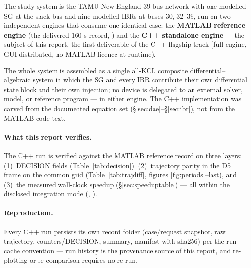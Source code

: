 The study system is the TAMU New England 39-bus network with one modelled SG at
the slack bus and nine modelled IBRs at buses 30, 32--39, run on two
independent engines that consume one identical case: the \textbf{MATLAB
reference engine} (the delivered 160-s record, )
and the \textbf{C++ standalone engine} --- the subject of this report, the
first deliverable of the C++ flagship track (full engine, GUI-distributed,
no MATLAB licence at runtime).

The whole system is assembled as a single all-KCL composite
differential--algebraic system in which the SG and every IBR contribute their
own differential state block and their own injection; no device is delegated
to an external solver, model, or reference program --- in either engine.  The
C++ implementation was carved from the documented equation set
(\S\ref{sec:dae}--\S\ref{sec:ibr}), not from the MATLAB code text.

\paragraph{What this report verifies.}
The C++ run is verified against the MATLAB reference record on three layers:
(1)~DECISION fields (Table~\ref{tab:decision}), (2)~trajectory parity in the
D5 frame on the common grid (Table~\ref{tab:trajdiff}, figures
\ref{fig:periods}--last), and (3)~the measured wall-clock speedup
(\S\ref{sec:speeduptable}) --- all within the disclosed integration mode
(\intmodes, \vscopecite).

\paragraph{Reproduction.}
Every C++ run persists its own record folder (case/request snapshot, raw
trajectory, counters/DECISION, summary, manifest with sha256) per the
run-cache convention --- run history is the provenance source of this
report, and re-plotting or re-comparison requires no re-run.
